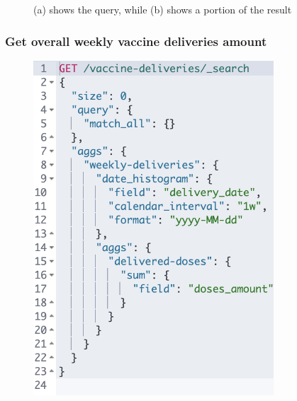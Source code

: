 \documentclass{article}[IEEEtran]
\begin{document}
\begin{figure}[H]
\begin{center}
\begin{minipage}[b]{0.4\textwidth}
     \subcaption{}
  \end{minipage}
  \caption{(a) shows the query, while (b) shows a portion of the result}
\end{center}
\end{figure}


\subsubsection{Get overall weekly vaccine deliveries amount}\label{ssec:q14}


\begin{figure}[H]
\begin{center}
\begin{minipage}[b]{0.4\textwidth}
    \includegraphics[width=0.8\textwidth, frame]{Query_10.PNG}
    \subcaption{}
  \end{minipage}
  \hfill
  \begin{minipage}[b]{0.4\textwidth}

\end{minipage}
\end{center}
\end{figure}
\end{document}
